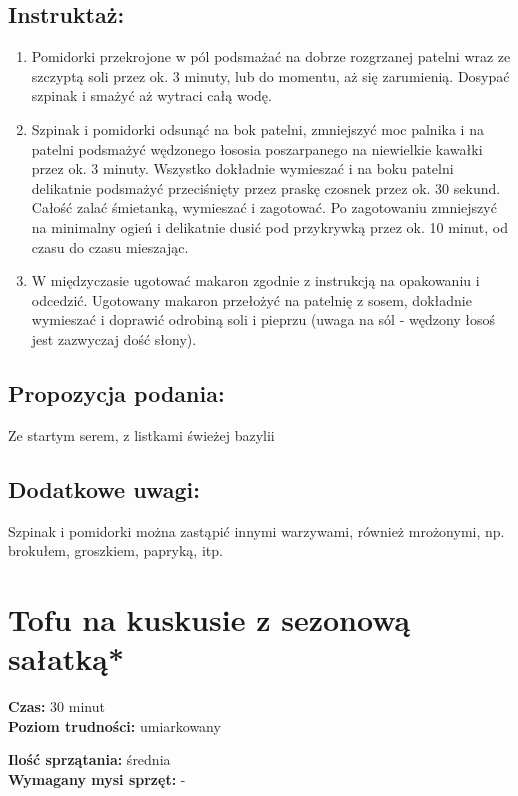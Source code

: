 \documentclass[a4paper,10pt]{book}
\begin{document}
\section*{Instruktaż:} \begin{enumerate} 
\item Pomidorki przekrojone w pól podsmażać na dobrze rozgrzanej patelni wraz ze szczyptą soli przez ok. 3 minuty, lub do momentu, aż się zarumienią. Dosypać szpinak i smażyć aż wytraci całą wodę.
\item Szpinak i pomidorki odsunąć na bok patelni, zmniejszyć moc palnika i na patelni podsmażyć wędzonego łososia poszarpanego na niewielkie kawałki przez ok. 3 minuty. Wszystko dokładnie wymieszać i na boku patelni delikatnie podsmażyć przeciśnięty przez praskę czosnek przez ok. 30 sekund. Całość zalać śmietanką, wymieszać i zagotować. Po zagotowaniu zmniejszyć na minimalny ogień i delikatnie dusić pod przykrywką przez ok. 10 minut, od czasu do czasu mieszając. 
\item W międzyczasie ugotować makaron zgodnie z instrukcją na opakowaniu i odcedzić. Ugotowany makaron przełożyć na patelnię z sosem, dokładnie wymieszać i doprawić odrobiną soli i pieprzu (uwaga na sól - wędzony łosoś jest zazwyczaj dość słony).
\end{enumerate}

\vspace{0.5cm}

\small \section*{Propozycja podania:} Ze startym serem, z listkami świeżej bazylii

\vspace{0.3cm}

\section*{Dodatkowe uwagi:} Szpinak i pomidorki można zastąpić innymi warzywami, również mrożonymi, np. brokułem, groszkiem, papryką, itp.

\chapter{Tofu na kuskusie z sezonową sałatką*}

\vspace{0.1cm}
\small
\begin{minipage}{0.45\textwidth}
    \noindent \textbf{Czas:} 30 minut \\
    \textbf{Poziom trudności:} umiarkowany
\end{minipage}
\begin{minipage}{0.45\textwidth}
    \noindent \textbf{Ilość sprzątania:} średnia\\
    \textbf{Wymagany mysi sprzęt:} -
\end{minipage}
\normalsize
\vspace{0.5cm}
\end{document}
